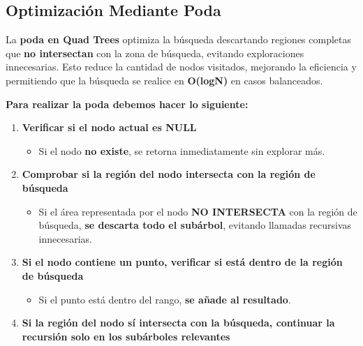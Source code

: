\documentclass[9pt,a4paper,twoside]{rho-class/rho}
\begin{document}
        \subsection{Optimización Mediante Poda}
                La \textbf{poda en Quad Trees} optimiza la búsqueda descartando regiones completas que \textbf{no intersectan} con la zona de búsqueda, evitando exploraciones innecesarias. Esto reduce la cantidad de nodos visitados, mejorando la eficiencia y permitiendo que la búsqueda se realice en \textbf{O(logN)} en casos balanceados.

                \textbf{Para realizar la poda debemos hacer lo siguiente:}
                \begin{enumerate}
                    \item \textbf{Verificar si el nodo actual es NULL}
                    \begin{itemize}
                        \item Si el nodo \textbf{no existe}, se retorna inmediatamente sin explorar más.
                    \end{itemize}
                    
                    \item \textbf{Comprobar si la región del nodo intersecta con la región de búsqueda}
                    \begin{itemize}
                        \item Si el área representada por el nodo \textbf{NO INTERSECTA} con la región de búsqueda, \textbf{se descarta todo el subárbol}, evitando llamadas recursivas innecesarias.
                    \end{itemize}
                    
                    \item \textbf{Si el nodo contiene un punto, verificar si está dentro de la región de búsqueda}
                    \begin{itemize}
                        \item Si el punto está dentro del rango, \textbf{se añade al resultado}.
                    \end{itemize}
                    
                    \item \textbf{Si la región del nodo sí intersecta con la búsqueda, continuar la recursión solo en los subárboles relevantes}
                \end{enumerate}
\end{document}

